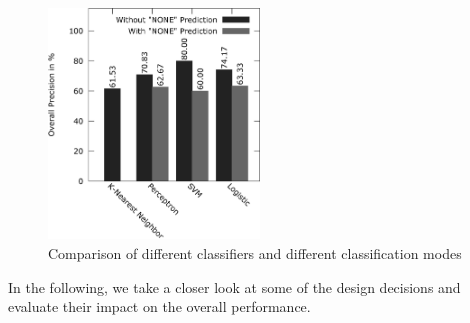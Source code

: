 \begin{figure}
	\begin{center}
		\includegraphics[width=0.5\textwidth]{figures/product_eval.eps}
	\end{center}
	\caption{Comparison of different classifiers and different classification modes}
	\label{fig:product_eval}
\end{figure}

In the following, we take a closer look at some of the design decisions and evaluate their impact on the overall performance.

